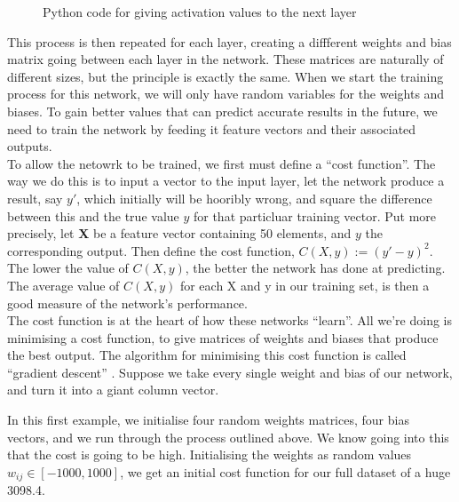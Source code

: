 \begin{figure}[h]%
    
    \caption{Python code for giving activation values to the next layer}
    \label{pyActVals}
\end{figure}


This process is then repeated for each layer, creating a diffferent weights and bias matrix going between each layer in the network. These matrices are naturally of different sizes, but the principle is exactly the same.
When we start the training process for this network, we will only have random variables for the weights and biases. To gain better values that can predict accurate results in the future,
we need to train the network by feeding it feature vectors and their associated outputs. \\

To allow the netowrk to be trained, we first must define a ``cost function''. The way we do this is to input a vector to the input layer, let the network produce a result, say $y'$, which
initially will be hooribly wrong, and square the difference between this and the true value $y$ for that particluar training vector. Put more precisely,
let \textbf{X} be a feature vector containing 50 elements, and $y$ the corresponding output. Then define the cost function, $C(X,y) := (y'-y)^2$. The lower the value of $C(X,y)$, the 
better the network has done at predicting. The average value of $C(X,y)$ for each X and y in our training set, is then a good measure of the network's performance. \\

The cost function is at the heart of how these networks ``learn''. All we're doing is minimising a cost function, to give matrices of weights and biases that
produce the best output. The algorithm for minimising this cost function is called ``gradient descent'' \cite{cauchy}. Suppose we take every single weight and bias of our network,
and turn it into a giant column vector. 

\begin{example}
    In this first example, we initialise four random weights matrices, four bias vectors, and we run through the process outlined above. We know going into this that 
    the cost is going to be high. Initialising the weights as random values $w_{ij} \in [-1000,1000]$, we get an initial cost function for our full dataset of a huge
    3098.4. 
\end{example}

